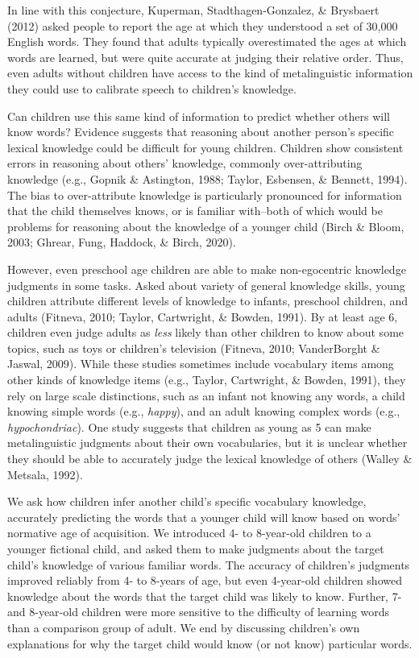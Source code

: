 \documentclass[10pt, letterpaper]{article}
\begin{document}
In line with this conjecture, Kuperman, Stadthagen-Gonzalez, \&
Brysbaert (2012) asked people to report the age at which they understood
a set of 30,000 English words. They found that adults typically
overestimated the ages at which words are learned, but were quite
accurate at judging their relative order. Thus, even adults without
children have access to the kind of metalinguistic information they
could use to calibrate speech to children's knowledge.

Can children use this same kind of information to predict whether others
will know words? Evidence suggests that reasoning about another person's
specific lexical knowledge could be difficult for young children.
Children show consistent errors in reasoning about others' knowledge,
commonly over-attributing knowledge (e.g., Gopnik \& Astington, 1988;
Taylor, Esbensen, \& Bennett, 1994). The bias to over-attribute
knowledge is particularly pronounced for information that the child
themselves knows, or is familiar with--both of which would be problems
for reasoning about the knowledge of a younger child (Birch \& Bloom,
2003; Ghrear, Fung, Haddock, \& Birch, 2020).

However, even preschool age children are able to make non-egocentric
knowledge judgments in some tasks. Asked about variety of general
knowledge skills, young children attribute different levels of knowledge
to infants, preschool children, and adults (Fitneva, 2010; Taylor,
Cartwright, \& Bowden, 1991). By at least age 6, children even judge
adults as \emph{less} likely than other children to know about some
topics, such as toys or children's television (Fitneva, 2010;
VanderBorght \& Jaswal, 2009). While these studies sometimes include
vocabulary items among other kinds of knowledge items (e.g., Taylor,
Cartwright, \& Bowden, 1991), they rely on large scale distinctions,
such as an infant not knowing any words, a child knowing simple words
(e.g., \emph{happy}), and an adult knowing complex words (e.g.,
\emph{hypochondriac}). One study suggests that children as young as 5
can make metalinguistic judgments about their own vocabularies, but it
is unclear whether they should be able to accurately judge the lexical
knowledge of others (Walley \& Metsala, 1992).

We ask how children infer another child's specific vocabulary knowledge,
accurately predicting the words that a younger child will know based on
words' normative age of acquisition. We introduced 4- to 8-year-old
children to a younger fictional child, and asked them to make judgments
about the target child's knowledge of various familiar words. The
accuracy of children's judgments improved reliably from 4- to 8-years of
age, but even 4-year-old children showed knowledge about the words that
the target child was likely to know. Further, 7- and 8-year-old children
were more sensitive to the difficulty of learning words than a
comparison group of adult. We end by discussing children's own
explanations for why the target child would know (or not know)
particular words.
\end{document}
